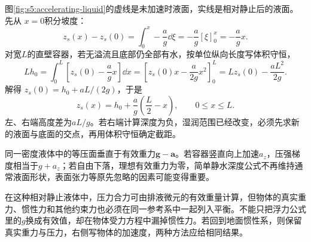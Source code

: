 图\ref{fig:s5:accelerating-liquid}的虚线是未加速时液面，实线是相对静止后的液面。先从 $x=0$积分坡度：
\[z_s(x)-z_s(0)=\int_0^x-\frac ag\dd\xi=-\frac ag[\xi]_0^x=-\frac agx.\]
对宽$L$的直壁容器，若无溢流且底部仍全部有水，按单位纵向长度写体积守恒，
\[Lh_0=\int_0^L\left[z_s(0)-\frac agx\right]\dd x
 =\left[z_s(0)x-\frac{a}{2g}x^2\right]_0^L
 =Lz_s(0)-\frac{aL^2}{2g}.\]
解得 $z_s(0)=h_0+aL/(2g)$，于是
\[
z_s(x)=h_0+\frac ag\left(\frac L2-x\right),\qquad 0\le x\le L.
\]
左、右端高度差为$aL/g$。若右端计算深度为负，湿润范围已经改变，必须先求新的液面与底面的交点，再用体积守恒确定截距。


同一密度液体中的等压面垂直于有效重力$\boldsymbol g-\boldsymbol a$。若容器竖直向上加速$a_z$，压强梯度相当于$g+a_z$；若自由下落，理想有效重力为零，简单静水深度公式不再维持通常液面形状，表面张力等原先忽略的因素可能变得重要。

在这种相对静止液体中，压力合力可由排液微元的有效重量计算，但物体的真实重力、惯性力和其他约束力也必须在同一参考系中一起列入平衡。不能只把浮力公式里的$g$换成有效值，却在物体受力方程中漏掉惯性力。若回到地面惯性系，则保留真实重力与压力，右侧写物体的加速度，两种方法应给相同结果。


